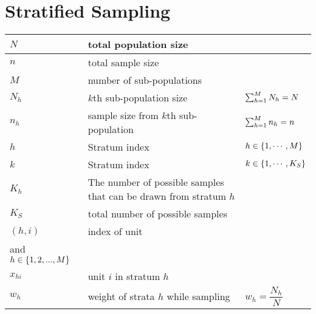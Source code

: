 \section{Stratified Sampling \cite{statistics/book/Statistics-for-Data-Scientists/Maurits-Kaptein}}\label{Sampling Plans/Representative Sampling/Stratified Sampling}

\begin{customArrayStretch}{1.3}
\begin{longtable}{>{\centering\arraybackslash}p{1.5cm} p{9cm} p{3.5cm}}

\hline\endfirsthead
\hline\endhead
\hline\endfoot
\hline\endlastfoot

$N$ & total population size & \\ \hline

$n$ & total sample size & \\ \hline

$M$ & number of sub-populations & \\ \hline

$N_h$ & $k$th sub-population size & $\textstyle\sum_{h=1}^{M} N_h = N$ \\ \hline

$n_h$ & sample size from $k$th sub-population & $\textstyle\sum_{h=1}^{M} n_h = n$ \\ \hline

$h$ & Stratum index & $h \in \left\{1, \cdots, M\right\}$ \\ \hline

$k$ & Stratum index & $k \in \left\{1, \cdots, K_S\right\}$ \\ \hline

$K_h$ & The number of possible samples that can be drawn from stratum $h$ \\ \hline

$K_S$ & total number of possible samples \\ \hline

$(h, i)$ & index of unit & \begin{minipage}{3.2cm}
    \vspace{0.1cm}
    $i \in \dCurlyBrac{1, 2,\cdots, N_h }$ \\
    and $h \in \left\{1, 2,..., M\right\}$
    \vspace{0.1cm}
\end{minipage}  \\ \hline

$x_{hi}$ & unit $i$ in stratum $h$ \\ \hline

$w_{h}$ & 
    weight of strata $h$ while sampling & 
    \begin{minipage}{3.2cm}
        \vspace{0.1cm}
        $w_{h} = \dfrac{N_h}{N}$
        \vspace{0.1cm}
    \end{minipage}
    \\ \hline


\end{longtable}
\end{customArrayStretch}
